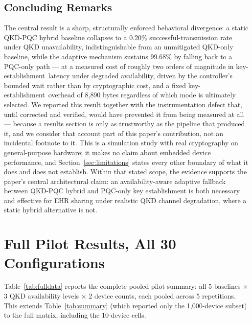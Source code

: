 \documentclass[journal]{IEEEtran}
\newcommand{\keyest}{key-establishment}
\begin{document}
\subsection{Concluding Remarks} The central result is a sharp, structurally enforced behavioral divergence: a static QKD-PQC hybrid baseline collapses to a 0.20\% successful-transmission rate under QKD unavailability, indistinguishable from an unmitigated QKD-only baseline, while the adaptive mechanism sustains 99.68\% by falling back to a PQC-only path --- at a measured cost of roughly two orders of magnitude in \keyest\ latency under degraded availability, driven by the controller's bounded wait rather than by cryptographic cost, and a fixed \keyest\ overhead of 8{,}890 bytes regardless of which mode is ultimately selected. We reported this result together with the instrumentation defect that, until corrected and verified, would have prevented it from being measured at all --- because a results section is only as trustworthy as the pipeline that produced it, and we consider that account part of this paper's contribution, not an incidental footnote to it. This is a simulation study with real cryptography on general-purpose hardware; it makes no claim about embedded device performance, and Section~\ref{sec:limitations} states every other boundary of what it does and does not establish. Within that stated scope, the evidence supports the paper's central architectural claim: an availability-aware adaptive fallback between QKD-PQC hybrid and PQC-only key establishment is both necessary and effective for EHR sharing under realistic QKD channel degradation, where a static hybrid alternative is not.

\appendices

\section{Full Pilot Results, All 30 Configurations}
\label{app:fulltable}

Table~\ref{tab:fulldata} reports the complete pooled pilot summary: all 5 baselines $\times$ 3 QKD availability levels $\times$ 2 device counts, each pooled across 5 repetitions. This extends Table~\ref{tab:summary} (which reported only the 1{,}000-device subset) to the full matrix, including the 10-device cells.
\end{document}

